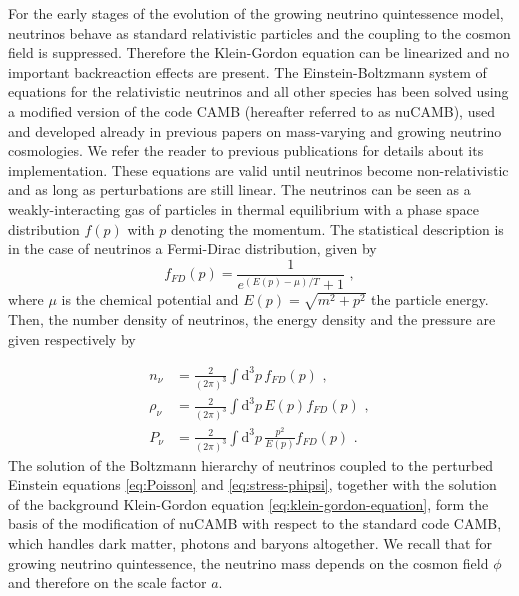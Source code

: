 For the early stages of the evolution of the growing neutrino quintessence
model, neutrinos behave as standard relativistic particles and the
coupling to the cosmon field is suppressed. Therefore the Klein-Gordon
equation can be linearized and no important backreaction effects are
present. The Einstein-Boltzmann system of equations for the relativistic
neutrinos and all other species has been solved using a modified version
of the code CAMB \cite{lewis_efficient_2000} (hereafter referred
to as nuCAMB), used and developed already in previous papers on mass-varying
and growing neutrino cosmologies. We refer the reader to previous
publications \cite{mota_neutrino_2008,pettorino_neutrino_2010,wintergerst_very_2010,brookfield_cosmology_2007}
for details about its implementation. These equations are valid until
neutrinos become non-relativistic and as long as perturbations are
still linear. The neutrinos can be seen as a weakly-interacting gas
of particles in thermal equilibrium with a phase space distribution
$f(p)$ with $p$ denoting the momentum. The statistical description
is in the case of neutrinos a Fermi-Dirac distribution, given by 
\begin{equation}
f_{FD}(p)=\frac{1}{e^{\left(E(p)-\mu\right)/T}+1}\,\,,\label{eq:Fermi-Dirac-dist}
\end{equation}
where $\mu$ is the chemical potential and $E(p)=\sqrt{m^{2}+p^{2}}$
the particle energy. Then, the number density of neutrinos, the energy
density and the pressure are given respectively by

\begin{align}
n_{\nu} & =\frac{2}{(2\pi)^{3}}\int\mbox{d}^{3}p\, f_{FD}(p)\,\,,\label{eq:nnu-FD}\\
\rho_{\nu} & =\frac{2}{(2\pi)^{3}}\int\mbox{d}^{3}p\, E(p)f_{FD}(p)\,\,,\label{eq:rhonu-FD}\\
P_{\nu} & =\frac{2}{(2\pi)^{3}}\int\mbox{d}^{3}p\,\frac{p^{2}}{E(p)}f_{FD}(p)\,\,.\label{eq:pnu-FD}
\end{align}
The solution of the Boltzmann hierarchy of neutrinos coupled to the
perturbed Einstein equations \ref{eq:Poisson} and \ref{eq:stress-phipsi},
together with the solution of the background Klein-Gordon equation
\ref{eq:klein-gordon-equation}, form the basis of the modification
of nuCAMB with respect to the standard code CAMB, which handles dark
matter, photons and baryons altogether. We recall that for growing
neutrino quintessence, the neutrino mass depends on the cosmon field
$\phi$ and therefore on the scale factor $a$.


